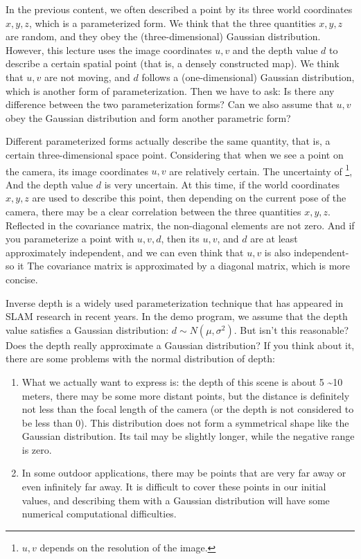 \clearpage
In the previous content, we often described a point by its three world coordinates $ x, y, z $, which is a parameterized form. We think that the three quantities $ x, y, z $ are random, and they obey the (three-dimensional) Gaussian distribution. However, this lecture uses the image coordinates $ u, v $ and the depth value $ d $ to describe a certain spatial point (that is, a densely constructed map). We think that $ u, v $ are not moving, and $ d $ follows a (one-dimensional) Gaussian distribution, which is another form of parameterization. Then we have to ask: Is there any difference between the two parameterization forms? Can we also assume that $ u, v $ obey the Gaussian distribution and form another parametric form?

Different parameterized forms actually describe the same quantity, that is, a certain three-dimensional space point. Considering that when we see a point on the camera, its image coordinates $ u, v $ are relatively certain. The uncertainty of \footnote{$ u, v $ depends on the resolution of the image. }, And the depth value $ d $ is very uncertain. At this time, if the world coordinates $ x, y, z $ are used to describe this point, then depending on the current pose of the camera, there may be a clear correlation between the three quantities $ x, y, z $. Reflected in the covariance matrix, the non-diagonal elements are not zero. And if you parameterize a point with $ u, v, d $, then its $ u, v $, and $ d $ are at least approximately independent, and we can even think that $ u, v $ is also independent-so it The covariance matrix is ​​approximated by a diagonal matrix, which is more concise.

Inverse depth is a widely used parameterization technique \textsuperscript{\cite{Montiel2006, Civera2008}} that has appeared in SLAM research in recent years. In the demo program, we assume that the depth value satisfies a Gaussian distribution: $ d \sim N (\mu, \sigma ^ 2) $. But isn't this reasonable? Does the depth really approximate a Gaussian distribution? If you think about it, there are some problems with the normal distribution of depth:

\begin{enumerate}
\item What we actually want to express is: the depth of this scene is about 5 \textasciitilde 10 meters, there may be some more distant points, but the distance is definitely not less than the focal length of the camera (or the depth is not considered to be less than 0). This distribution does not form a symmetrical shape like the Gaussian distribution. Its tail may be slightly longer, while the negative range is zero.
\item In some outdoor applications, there may be points that are very far away or even infinitely far away. It is difficult to cover these points in our initial values, and describing them with a Gaussian distribution will have some numerical computational difficulties.
\end{enumerate}

